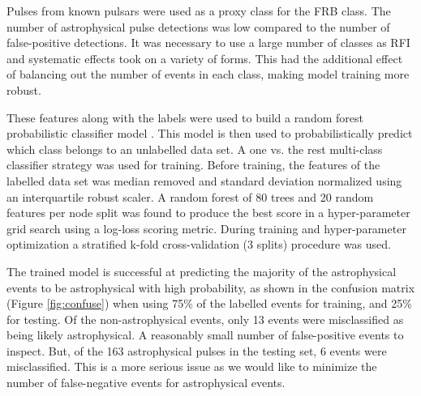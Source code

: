 \documentclass[a4paper,fleqn,usenatbib]{mnras}
\begin{document}
Pulses from known pulsars were used as a proxy class for the FRB class. The
number of astrophysical pulse detections was low compared to the number of
false-positive detections. It was necessary to use a large number of classes
as RFI and systematic effects took on a variety of forms.  This had the
additional effect of balancing out the number of events in each class, making
model training more robust.

These features along with the labels were used to build a random forest
probabilistic classifier model \citep{Ho:1995:RDF:844379.844681,Breiman2001}.
This model is then used to probabilistically predict which class belongs to an unlabelled
data set. A one vs. the rest multi-class classifier strategy was used
for training. Before training, the features of the labelled data set was median
removed and standard deviation normalized using an interquartile robust scaler.
A random forest of 80 trees and 20 random features per node split was found to
produce the best score in a hyper-parameter grid search using a
log-loss scoring metric. During training and hyper-parameter optimization a
stratified k-fold cross-validation (3 splits) procedure was used.

The trained model is successful at predicting the majority of the astrophysical
events to be astrophysical with high probability, as shown in the confusion
matrix (Figure \ref{fig:confuse}) when using 75\% of the labelled events for
training, and 25\% for testing. Of the non-astrophysical events, only 13 events
were misclassified as being likely astrophysical. A reasonably small number of
false-positive events to inspect. But, of the 163 astrophysical pulses in the
testing set, 6 events were misclassified. This is a more serious issue as we
would like to minimize the number of false-negative events for astrophysical
events.
\end{document}

